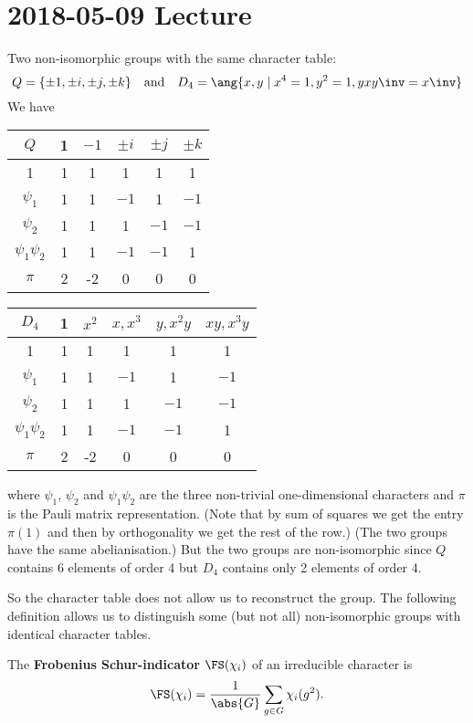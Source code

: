 \section{2018-05-09 Lecture}

\begin{exam}
  Two non-isomorphic groups with the same character table:
  \[ Q = \{ \pm 1, \pm i, \pm j, \pm k \} \quad\text{and}\quad D_4 = \ang{x,y \mid x^4=1,y^2=1,yxy\inv=x\inv} \]
  We have
  \begin{center}
    \begin{tabular}[]{c | c c c c c}
      $Q$ & 1 & $-1$ & $\pm i$ & $\pm j$ & $\pm k$ \\ \hline
      1 & 1 & 1 & 1 & 1 & 1 \\
      $\psi_1$ & 1 & 1 & $-1$ & 1 & $-1$ \\
      $\psi_2$ & 1 & 1 & 1 & $-1$ & $-1$ \\
      $\psi_1\psi_2$ & 1 & 1 & $-1$ & $-1$ & 1 \\
      $\pi$ & 2 & -2 & 0 & 0 & 0
    \end{tabular}
    \hspace{1cm}
    \begin{tabular}[]{c | c c c c c}
      $D_4$ & 1 & $x^2$ & $x,x^3$ & $y,x^2y$ & $xy,x^3y$ \\ \hline
      1 & 1 & 1 & 1 & 1 & 1 \\
      $\psi_1$ & 1 & 1 & $-1$ & 1 & $-1$ \\
      $\psi_2$ & 1 & 1 & 1 & $-1$ & $-1$ \\
      $\psi_1\psi_2$ & 1 & 1 & $-1$ & $-1$ & 1 \\
      $\pi$ & 2 & -2 & 0 & 0 & 0
    \end{tabular}
  \end{center}
  where $\psi_1$, $\psi_2$ and $\psi_1\psi_2$ are the three non-trivial one-dimensional characters and $\pi$ is the Pauli matrix representation.
  (Note that by sum of squares we get the entry $\pi(1)$ and then by orthogonality we get the rest of the row.)
  (The two groups have the same abelianisation.)
  But the two groups are non-isomorphic since $Q$ contains 6 elements of order 4 but $D_4$ contains only 2 elements of order 4.
\end{exam}

So the character table does not allow us to reconstruct the group.
The following definition allows us to distinguish some (but not all) non-isomorphic groups with identical character tables.

\begin{defn}
  The \textbf{Frobenius Schur-indicator} $\FS(\chi_i)$ of an irreducible character is
  \[ \FS(\chi_i) = \frac{1}{\abs{G}} \sum_{g \in G} \chi_i(g^2). \]
\end{defn}

